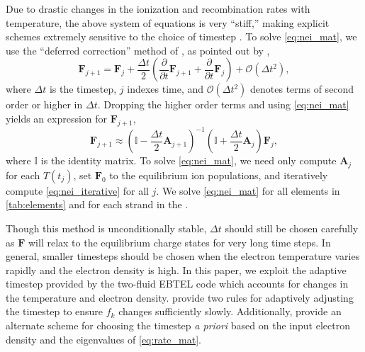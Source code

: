 Due to drastic changes in the ionization and recombination rates with temperature, the above system of equations is very ``stiff,'' making explicit schemes extremely sensitive to the choice of timestep \citep{macneice_numerical_1984,bradshaw_numerical_2009}. To solve \autoref{eq:nei_mat}, we use the ``deferred correction'' method of \citet{npl_national_physical_laboratory_modern_1961}, as pointed out by \citet{macneice_numerical_1984},
\begin{equation*}
    \mathbf{F}_{j+1} = \mathbf{F}_j + \frac{\Delta t}{2}\left(\frac{\partial}{\partial t}\mathbf{F}_{j+1} + \frac{\partial}{\partial t}\mathbf{F}_j\right) + \mathcal{O}(\Delta t^2),
\end{equation*}
where $\Delta t$ is the timestep, $j$ indexes time, and $\mathcal{O}(\Delta t^2)$ denotes terms of second order or higher in $\Delta t$. Dropping the higher order terms and using \autoref{eq:nei_mat} yields an expression for $\mathbf{F}_{j+1}$,
\begin{equation}\label{eq:nei_iterative}
    \mathbf{F}_{j+1} \approx \left(\mathbb{I} - \frac{\Delta t}{2}\mathbf{A}_{j+1}\right)^{-1}\left(\mathbb{I} + \frac{\Delta t}{2}\mathbf{A}_{j}\right)\mathbf{F}_j,
\end{equation}
where $\mathbb{I}$ is the identity matrix. To solve \autoref{eq:nei_mat}, we need only compute $\mathbf{A}_j$ for each $T(t_j)$, set $\mathbf{F}_0$ to the equilibrium ion populations, and iteratively compute \autoref{eq:nei_iterative} for all $j$. We solve \autoref{eq:nei_mat} for all elements in \autoref{tab:elements} and for each strand in the \AR{}.

Though this method is unconditionally stable, $\Delta t$ should still be chosen carefully as $\mathbf{F}$ will relax to the equilibrium charge states for very long time steps. In general, smaller timesteps should be chosen when the electron temperature varies rapidly and the electron density is high. In this paper, we exploit the adaptive timestep provided by the two-fluid EBTEL code which accounts for changes in the temperature and electron density. \citet{macneice_numerical_1984} provide two rules for adaptively adjusting the timestep to ensure $f_k$ changes sufficiently slowly. Additionally, \citet{shen_lagrangian_2015} provide an alternate scheme for choosing the timestep \textit{a priori} based on the input electron density and the eigenvalues of \autoref{eq:rate_mat}.

